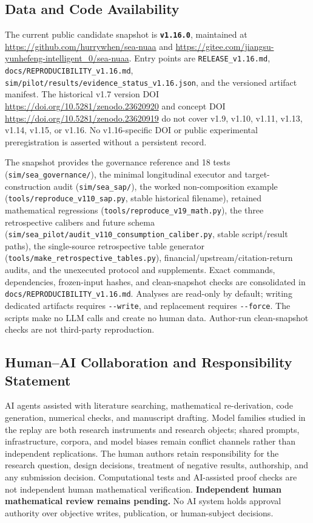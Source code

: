 \documentclass[
  11pt]{article}
\begin{document}
\subsection{Data and Code
Availability}\label{data-and-code-availability}

The current public candidate snapshot is \textbf{\texttt{v1.16.0}},
maintained at \url{https://github.com/hurrywhen/sea-nuaa} and
\url{https://gitee.com/jiangsu-yunhefeng-intelligent_0/sea-nuaa}. Entry
points are \texttt{RELEASE\_v1.16.md},
\texttt{docs/REPRODUCIBILITY\_v1.16.md},
\texttt{sim/pilot/results/evidence\_status\_v1.16.json}, and the
versioned artifact manifest. The historical v1.7 version DOI
\url{https://doi.org/10.5281/zenodo.23620920} and concept DOI
\url{https://doi.org/10.5281/zenodo.23620919} do not cover v1.9, v1.10,
v1.11, v1.13, v1.14, v1.15, or v1.16. No v1.16-specific DOI or public
experimental preregistration is asserted without a persistent record.

The snapshot provides the governance reference and 18 tests
(\texttt{sim/sea\_governance/}), the minimal longitudinal executor and
target-construction audit (\texttt{sim/sea\_sap/}), the worked
non-composition example (\texttt{tools/reproduce\_v110\_sap.py}, stable
historical filename), retained mathematical regressions
(\texttt{tools/reproduce\_v19\_math.py}), the three retrospective
calibers and future schema
(\texttt{sim/sea\_pilot/audit\_v110\_consumption\_caliber.py}, stable
script/result paths), the single-source retrospective table generator
(\texttt{tools/make\_retrospective\_tables.py}),
financial/upstream/citation-return audits, and the unexecuted protocol
and supplements. Exact commands, dependencies, frozen-input hashes, and
clean-snapshot checks are consolidated in
\texttt{docs/REPRODUCIBILITY\_v1.16.md}. Analyses are read-only by
default; writing dedicated artifacts requires \texttt{-\/-write}, and
replacement requires \texttt{-\/-force}. The scripts make no LLM calls
and create no human data. Author-run clean-snapshot checks are not
third-party reproduction.

\subsection{Human--AI Collaboration and Responsibility
Statement}\label{humanai-collaboration-and-responsibility-statement}

AI agents assisted with literature searching, mathematical
re-derivation, code generation, numerical checks, and manuscript
drafting. Model families studied in the replay are both research
instruments and research objects; shared prompts, infrastructure,
corpora, and model biases remain conflict channels rather than
independent replications. The human authors retain responsibility for
the research question, design decisions, treatment of negative results,
authorship, and any submission decision. Computational tests and
AI-assisted proof checks are not independent human mathematical
verification. \textbf{Independent human mathematical review remains
pending.} No AI system holds approval authority over objective writes,
publication, or human-subject decisions.
\end{document}
